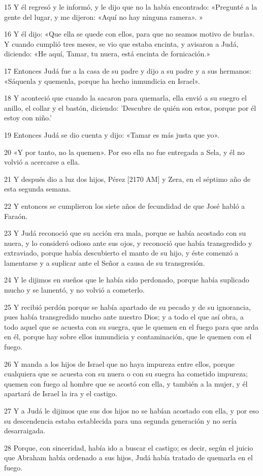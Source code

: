\par 15 Y él regresó y le informó, y le dijo que no la había encontrado: «Pregunté a la gente del lugar, y me dijeron: «Aquí no hay ninguna ramera». »
\par 16 Y él dijo: «Que ella se quede con ellos, para que no seamos motivo de burla». Y cuando cumplió tres meses, se vio que estaba encinta, y avisaron a Judá, diciendo: «He aquí, Tamar, tu nuera, está encinta de fornicación.»
\par 17 Entonces Judá fue a la casa de su padre y dijo a su padre y a sus hermanos: «Sáquenla y quemenla, porque ha hecho inmundicia en Israel».
\par 18 Y aconteció que cuando la sacaron para quemarla, ella envió a su suegro el anillo, el collar y el bastón, diciendo: 'Descubre de quién son estos, porque por él estoy con niño.'
\par 19 Entonces Judá se dio cuenta y dijo: «Tamar es más justa que yo».
\par 20 «Y por tanto, no la quemen». Por eso ella no fue entregada a Sela, y él no volvió a acercarse a ella.
\par 21 Y después dio a luz dos hijos, Pérez [2170 AM] y Zera, en el séptimo año de esta segunda semana.
\par 22 Y entonces se cumplieron los siete años de fecundidad de que José habló a Faraón.
\par 23 Y Judá reconoció que su acción era mala, porque se había acostado con su nuera, y lo consideró odioso ante sus ojos, y reconoció que había transgredido y extraviado, porque había descubierto el manto de su hijo, y éste comenzó a lamentarse y a suplicar ante el Señor a causa de su transgresión.
\par 24 Y le dijimos en sueños que le había sido perdonado, porque había suplicado mucho y se lamentó, y no volvió a cometerlo.
\par 25 Y recibió perdón porque se había apartado de su pecado y de su ignorancia, pues había transgredido mucho ante nuestro Dios; y a todo el que así obra, a todo aquel que se acuesta con su suegra, que le quemen en el fuego para que arda en él, porque hay sobre ellos inmundicia y contaminación, que le quemen con el fuego.
\par 26 Y manda a los hijos de Israel que no haya impureza entre ellos, porque cualquiera que se acuesta con su nuera o con su suegra ha cometido impureza; quemen con fuego al hombre que se acostó con ella, y también a la mujer, y él apartará de Israel la ira y el castigo.
\par 27 Y a Judá le dijimos que sus dos hijos no se habían acostado con ella, y por eso su descendencia estaba establecida para una segunda generación y no sería desarraigada.
\par 28 Porque, con sinceridad, había ido a buscar el castigo; es decir, según el juicio que Abraham había ordenado a sus hijos, Judá había tratado de quemarla en el fuego.

